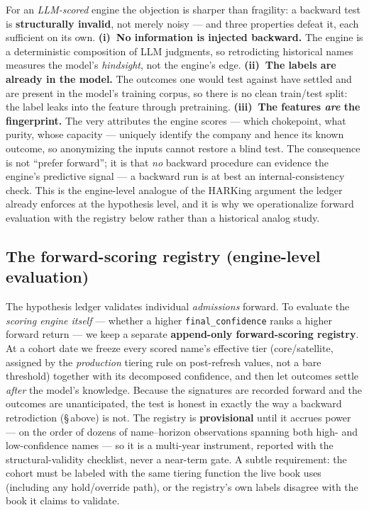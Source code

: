 \documentclass[11pt]{article}
\begin{document}
For an \emph{LLM-scored} engine the objection is sharper than fragility: a backward test is
\textbf{structurally invalid}, not merely noisy --- and three properties defeat it, each sufficient on
its own. \textbf{(i)~No information is injected backward.} The engine is a deterministic composition of
LLM judgments, so retrodicting historical names measures the model's \emph{hindsight}, not the engine's
edge. \textbf{(ii)~The labels are already in the model.} The outcomes one would test against have
settled and are present in the model's training corpus, so there is no clean train/test split: the
label leaks into the feature through pretraining. \textbf{(iii)~The features \emph{are} the
fingerprint.} The very attributes the engine scores --- which chokepoint, what purity, whose capacity
--- uniquely identify the company and hence its known outcome, so anonymizing the inputs cannot restore
a blind test. The consequence is not ``prefer forward''; it is that \emph{no} backward procedure can
evidence the engine's predictive signal --- a backward run is at best an internal-consistency check.
This is the engine-level analogue of the HARKing argument the ledger already enforces at the hypothesis
level, and it is why we operationalize forward evaluation with the registry below rather than a
historical analog study.

\subsection*{The forward-scoring registry (engine-level evaluation)}

The hypothesis ledger validates individual \emph{admissions} forward. To evaluate the \emph{scoring
engine itself} --- whether a higher \texttt{final\_confidence} ranks a higher forward return --- we
keep a separate \textbf{append-only forward-scoring registry}. At a cohort date we freeze every scored
name's effective tier (core/satellite, assigned by the \emph{production} tiering rule on post-refresh
values, not a bare threshold) together with its decomposed confidence, and then let outcomes settle
\emph{after} the model's knowledge. Because the signatures are recorded forward and the outcomes are
unanticipated, the test is honest in exactly the way a backward retrodiction (\S\,above) is not. The
registry is \textbf{provisional} until it accrues power --- on the order of dozens of
name--horizon observations spanning both high- and low-confidence names --- so it is a multi-year
instrument, reported with the structural-validity checklist, never a near-term gate. A subtle
requirement: the cohort must be labeled with the same tiering function the live book uses (including
any hold/override path), or the registry's own labels disagree with the book it claims to validate.
\end{document}
